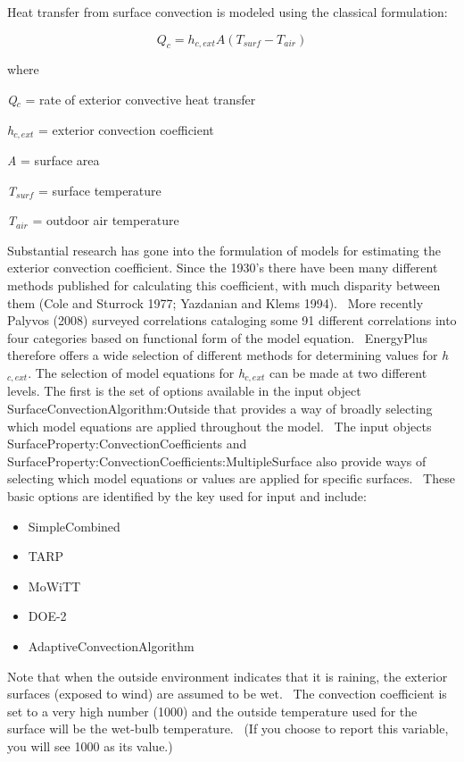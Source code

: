 Heat transfer from surface convection is modeled using the classical formulation:

\begin{equation}
{Q_c} = {h_{c,ext}}A\left( {{T_{surf}} - {T_{air}}} \right)
\end{equation}

where

\emph{Q\(_{c}\)} = rate of exterior convective heat transfer

\emph{h\(_{c,ext}\)} = exterior convection coefficient

\emph{A} = surface area

\emph{T\(_{surf}\)} = surface temperature

\emph{T\(_{air}\)} = outdoor air temperature

Substantial research has gone into the formulation of models for estimating the exterior convection coefficient. Since the 1930's there have been many different methods published for calculating this coefficient, with much disparity between them (Cole and Sturrock 1977; Yazdanian and Klems 1994).~ More recently Palyvos (2008) surveyed correlations cataloging some 91 different correlations into four categories based on functional form of the model equation.~ EnergyPlus therefore offers a wide selection of different methods for determining values for \emph{h\(_{c,ext}\)}. The selection of model equations for \emph{h\(_{c,ext}\)} can be made at two different levels. The first is the set of options available in the input object SurfaceConvectionAlgorithm:Outside that provides a way of broadly selecting which model equations are applied throughout the model.~ The input objects SurfaceProperty:ConvectionCoefficients and SurfaceProperty:ConvectionCoefficients:MultipleSurface also provide ways of selecting which model equations or values are applied for specific surfaces.~ These basic options are identified by the key used for input and include:

\begin{itemize}
\item
  SimpleCombined
\item
  TARP
\item
  MoWiTT
\item
  DOE-2
\item
  AdaptiveConvectionAlgorithm
\end{itemize}

Note that when the outside environment indicates that it is raining, the exterior surfaces (exposed to wind) are assumed to be wet.~ The convection coefficient is set to a very high number (1000) and the outside temperature used for the surface will be the wet-bulb temperature.~ (If you choose to report this variable, you will see 1000 as its value.)

